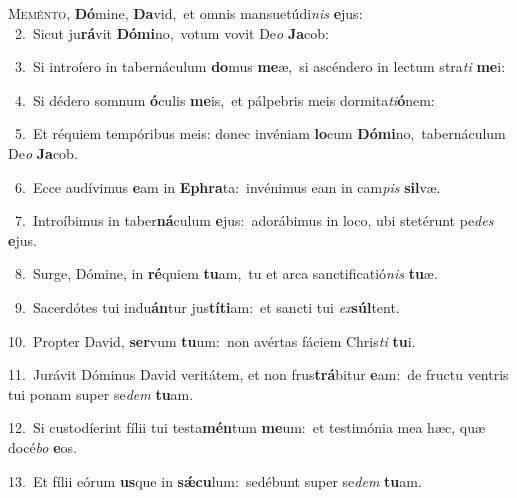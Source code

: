 \lettrine{\initial\textcolor{\initialcolor}{M}}{eménto,} \textbf{Dó}\-mine, \textbf{Da}\-vid,~\star et omnis mansuetúdi\textit{nis} \textbf{e}\-jus:\\
{\numbfont\textcolor{\numbcolor}{~2.}}~Sicut ju\-\textbf{rá}\-vit \textbf{Dó}\-\textbf{mi}no,~\star votum vovit De\textit{o} \textbf{Ja}\-cob:\par
{\numbfont\textcolor{\numbcolor}{~3.}}~Si introíero in tabernáculum \textbf{do}\-mus \textbf{me}\-æ,~\star si ascéndero in lectum stra\textit{ti} \textbf{me}\-i:\par
{\numbfont\textcolor{\numbcolor}{~4.}}~Si dédero somnum \textbf{ó}\-culis \textbf{me}\-is,~\star et pálpebris meis dormita\-\textit{ti}\-\textbf{ó}nem:\par
{\numbfont\textcolor{\numbcolor}{~5.}}~Et réquiem tempóribus meis: donec invéniam \textbf{lo}\-cum \textbf{Dó}\-\textbf{mi}no,~\star tabernáculum De\textit{o} \textbf{Ja}\-cob.\par
{\numbfont\textcolor{\numbcolor}{~6.}}~Ecce audívimus \textbf{e}\-am in \textbf{E}\-\textbf{phra}ta:~\star invénimus eam in cam\textit{pis} \textbf{sil}\-væ.\par
{\numbfont\textcolor{\numbcolor}{~7.}}~Introíbimus in taber\-\textbf{ná}\-culum \textbf{e}\-jus:~\star adorábimus in loco, ubi stetérunt pe\textit{des} \textbf{e}\-jus.\par
{\numbfont\textcolor{\numbcolor}{~8.}}~Surge, Dómine, in \textbf{ré}\-quiem \textbf{tu}\-am,~\star tu et arca sanctificatió\textit{nis} \textbf{tu}\-æ.\par
{\numbfont\textcolor{\numbcolor}{~9.}}~Sacerdótes tui indu\-\textbf{án}\-tur jus\-\textbf{tí}\-\textbf{ti}am:~\star et sancti tui \textit{ex}\-\textbf{súl}tent.\par
{\numbfont\textcolor{\numbcolor}{10.}}~Propter David, \textbf{ser}\-vum \textbf{tu}\-um:~\star non avértas fáciem Chris\textit{ti} \textbf{tu}\-i.\par
{\numbfont\textcolor{\numbcolor}{11.}}~Jurávit Dóminus David veritátem, et non frus\-\textbf{trá}\-bitur \textbf{e}\-am:~\star de fructu ventris tui ponam super se\textit{dem} \textbf{tu}\-am.\par
{\numbfont\textcolor{\numbcolor}{12.}}~Si custodíerint fílii tui testa\-\textbf{mén}\-tum \textbf{me}\-um:~\star et testimónia mea hæc, quæ docé\textit{bo} \textbf{e}\-os.\par
{\numbfont\textcolor{\numbcolor}{13.}}~Et fílii eórum \textbf{us}\-que in \textbf{sǽ}\-\textbf{cu}lum:~\star sedébunt super se\textit{dem} \textbf{tu}\-am.\par
